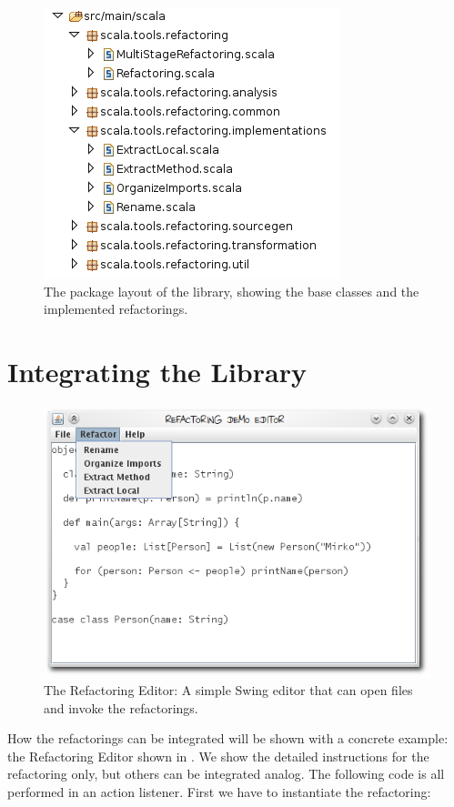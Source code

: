 \documentclass[10pt,a4paper,oneside]{scrreprt}
\begin{document}
\begin{figure}
  \centering
  \includegraphics[width=0.5\linewidth]{package-layout.png}
  \caption{The package layout of the library, showing the base classes and the implemented refactorings.}
  \label{figure:package-layout}
\end{figure}

\section{Integrating the Library}

\begin{figure}
  \centering
  \includegraphics[width=0.7\linewidth]{refactoring-editor.png}
  \caption{The Refactoring Editor: A simple Swing editor that can open files and invoke the refactorings.}
  \label{figure:refactoring-editor}
\end{figure}

How the refactorings can be integrated will be shown with a concrete example: the Refactoring Editor shown in . We show the detailed instructions for the  refactoring only, but others can be integrated analog. The following code is all performed in an action listener. First we have to instantiate the refactoring:
\end{document}
